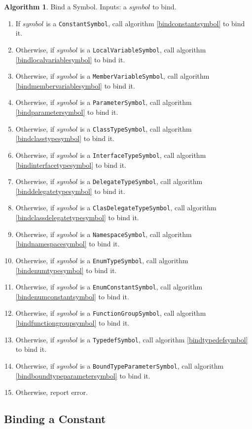 \documentclass[a4paper,oneside,11pt]{book}
\theoremstyle{definition}
\newtheorem{algo}{Algorithm}[section]
\begin{document}
\begin{algo}\label{bindsymbol} Bind a Symbol.
Inputs: a $symbol$ to bind.
\begin{enumerate}
\item
If $symbol$ is a \verb|ConstantSymbol|, call algorithm \ref{bindconstantsymbol} to bind it.
\item
Otherwise, if $symbol$ is a \verb|LocalVariableSymbol|, call algorithm \ref{bindlocalvariablesymbol} to bind it.
\item
Otherwise, if $symbol$ is a \verb|MemberVariableSymbol|, call algorithm \ref{bindmembervariablesymbol} to bind it.
\item
Otherwise, if $symbol$ is a \verb|ParameterSymbol|, call algorithm \ref{bindparametersymbol} to bind it.
\item
Otherwise, if $symbol$ is a \verb|ClassTypeSymbol|, call algorithm \ref{bindclasstypesymbol} to bind it.
\item
Otherwise, if $symbol$ is a \verb|InterfaceTypeSymbol|, call algorithm \ref{bindinterfacetypesymbol} to bind it.
\item
Otherwise, if $symbol$ is a \verb|DelegateTypeSymbol|, call algorithm \ref{binddelegatetypesymbol} to bind it.
\item
Otherwise, if $symbol$ is a \verb|ClasDelegateTypeSymbol|, call algorithm \ref{bindclassdelegatetypesymbol} to bind it.
\item
Otherwise, if $symbol$ is a \verb|NamespaceSymbol|, call algorithm \ref{bindnamespacesymbol} to bind it.
\item
Otherwise, if $symbol$ is a \verb|EnumTypeSymbol|, call algorithm \ref{bindenumtypesymbol} to bind it.
\item
Otherwise, if $symbol$ is a \verb|EnumConstantSymbol|, call algorithm \ref{bindenumconstantsymbol} to bind it.
\item
Otherwise, if $symbol$ is a \verb|FunctionGroupSymbol|, call algorithm \ref{bindfunctiongroupsymbol} to bind it.
\item
Otherwise, if $symbol$ is a \verb|TypedefSymbol|, call algorithm \ref{bindtypedefsymbol} to bind it.
\item
Otherwise, if $symbol$ is a \verb|BoundTypeParameterSymbol|, call algorithm \ref{bindboundtypeparametersymbol} to bind it.
\item
Otherwise, report error.
\end{enumerate}
\end{algo}

\subsection{Binding a Constant}
\end{document}
